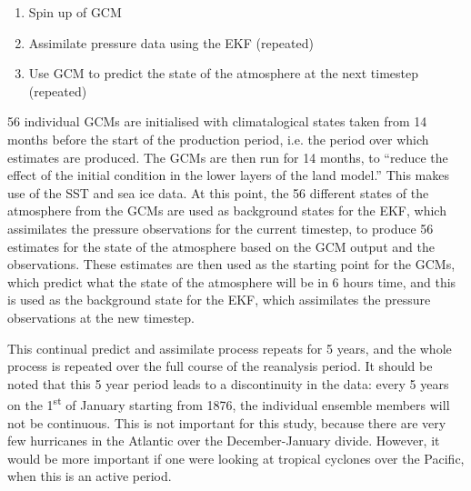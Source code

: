 \documentclass[pdftex,12pt,a4paper]{report}
\newcommand{\ts}{\textsuperscript}
\begin{document}
\begin{enumerate}
    \item Spin up of GCM
    \item Assimilate pressure data using the EKF (repeated)
    \item Use GCM to predict the state of the atmosphere at the next timestep (repeated)
\end{enumerate}

56 individual GCMs are initialised with climatalogical states taken from 14 months before the start
of the production period, i.e. the period over which estimates are produced. The GCMs are then run
for 14 months, to ``reduce the effect of the initial condition in the lower layers of the land
model.'' This makes use of the SST and sea ice data. At this point, the 56 different states of the
atmosphere from the GCMs are used as background states for the EKF, which assimilates the pressure
observations for the current timestep, to produce 56 estimates for the state of the atmosphere based
on the GCM output and the observations. These estimates are then used as the starting point for the
GCMs, which predict what the state of the atmosphere will be in 6 hours time, and this is used as
the background state for the EKF, which assimilates the pressure observations at the new timestep.

This continual predict and assimilate process repeats for 5 years, and the whole process is repeated
over the full course of the reanalysis period. It should be noted that this 5 year period leads to a
discontinuity in the data: every 5 years on the 1\ts{st} of January starting from 1876, the
individual ensemble members will not be continuous. This is not important for this study, because
there are very few hurricanes in the Atlantic over the December-January divide. However, it would be
more important if one were looking at tropical cyclones over the Pacific, when this is an active
period.
\end{document}
